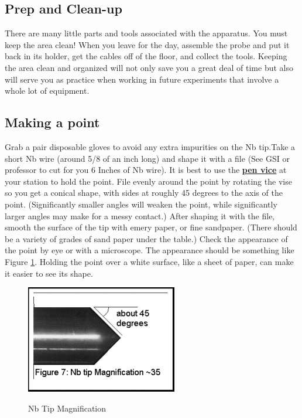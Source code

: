 \documentclass{../lab}
\begin{document}
\subsection{Prep and Clean-up}

There are many little parts and tools associated with the apparatus. You must keep the area clean! When you leave for the day, assemble the probe and put it back in its holder, get the cables off of the floor, and collect the tools. Keeping the area clean and organized will not only save you a great deal of time but also will serve you as practice when working in future experiments that involve a whole lot of equipment.

\subsection{Making a point}

Grab a pair disposable gloves to avoid any extra impurities on the Nb tip.Take a short Nb wire (around 5/8 of an inch long) and shape it with a file (See GSI or professor to cut for you 6 Inches of Nb wire). It is best to use the \href{http://experimentationlab.berkeley.edu/sites/default/files/JOS/vicepen\_0.jpeg}{\textbf{pen vice}} at your station to hold the point. File evenly around the point by rotating the vise so you get a conical shape, with sides at roughly 45 degrees to the axis of the point. (Significantly smaller angles will weaken the point, while significantly larger angles may make for a messy contact.) After shaping it with the file, smooth the surface of the tip with emery paper, or fine sandpaper. (There should be a variety of grades of sand paper under the table.) Check the appearance of the point by eye or with a microscope. The appearance should be something like Figure \ref{fig:NbTipMagnification}. Holding the point over a white surface, like a sheet of paper, can make it easier to see its shape.

\begin{figure}[h]
    \centering
    \href{http://experimentationlab.berkeley.edu/sites/default/files/images/250px-JOS11b.gif}{\includegraphics[width=0.5\linewidth]{images/250px-JOS11b.png}}
    \caption{Nb Tip Magnification}
    \label{fig:NbTipMagnification}
\end{figure}
 
\end{document}
